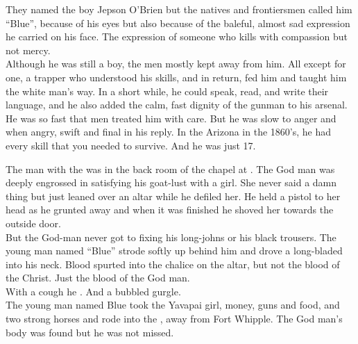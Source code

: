They named the boy Jepson O'Brien but the natives and frontiersmen called him ``Blue'', because of his eyes but also because of the baleful, almost sad expression he carried on his face. The expression of someone who kills with compassion but not mercy. \\

Although he was still a boy, the men mostly kept away from him. All except for one, a trapper who understood his skills, and in return, fed him and taught him the white man's way. In a short while, he could speak, read, and write their language, and he also added the calm, fast dignity of the gunman to his arsenal. \\

He was so fast that men treated him with care. But he was slow to anger and when angry, swift and final in his reply. In the Arizona  in the 1860's, he had every skill that you needed to survive. And he was just 17. \\





The  man with the  was in the back room of the chapel at . The God man was deeply engrossed in satisfying his goat-lust with a  girl. She never said a damn thing but just leaned over an altar while he defiled her. He held a pistol to her head as he grunted away and when it was finished he shoved her towards the outside door. \\

But the God-man never got to fixing his long-johns or his black trousers. The young man named ``Blue'' strode softly up behind him and drove a long-bladed  into his neck. Blood spurted into the chalice on the altar, but not the blood of the Christ. Just the blood of the God man. \\

With a cough he . And a bubbled gurgle. \\

The young man named Blue took the Yavapai girl, money, guns and food, and two strong horses and rode into the , away from Fort Whipple. The God man's body was found but he was not missed. \\

